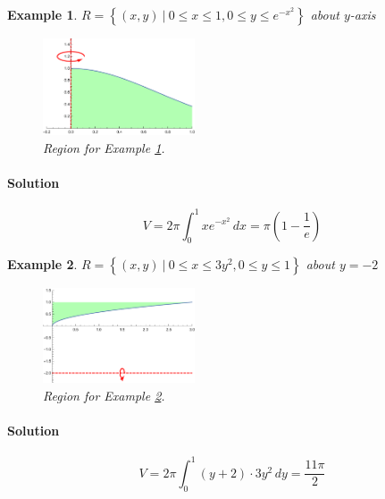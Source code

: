 \documentclass[letterpaper, 11pt, openany]{book}
\theoremstyle{mytheoremstyle}
\theoremstyle{myexamplestyle}
\newtheorem{example}{Example}[section]
\newenvironment{solution}{\paragraph{\sffamily \smaller \fontseries{b}\selectfont Solution}}{\hfill\faSquare}
\begin{document}
\begin{example}
    \label{e:volshexp}$R = \left\{ (x,y) \ | \ 0 \leq x \leq 1, 0 \leq y \leq e^{-x^{2}} \right\}$ about $y$-axis
    \begin{figure}[htbp]
        \centering
            \includegraphics[width=0.4\textwidth]{Figures/volshexp.pdf}
        \caption{Region for Example \ref{e:volshexp}.}
        \label{f:volshexp}
    \end{figure}
    
    \begin{solution}
        \[V = 2\pi\int_{0}^{1} x e^{-x^{2}} \, dx = \pi \left( 1 - \frac{1}{e} \right)\]
    \end{solution}
\end{example}

\begin{example}
    \label{e:volshwrty}$R = \left\{ (x,y) \ | \ 0 \leq x \leq 3y^{2}, 0 \leq y \leq 1 \right\}$ about $y = -2$
    \begin{figure}[htbp]
        \centering
            \includegraphics[width=0.4\textwidth]{Figures/volshwrty.pdf}
        \caption{Region for Example \ref{e:volshwrty}.}
        \label{f:volshwrty}
    \end{figure}
    
    \begin{solution}
        \[V = 2\pi\int_{0}^{1} (y+2)\cdot 3y^{2} \, dy = \frac{11\pi}{2}\]
    \end{solution}
\end{example}
\end{document}
